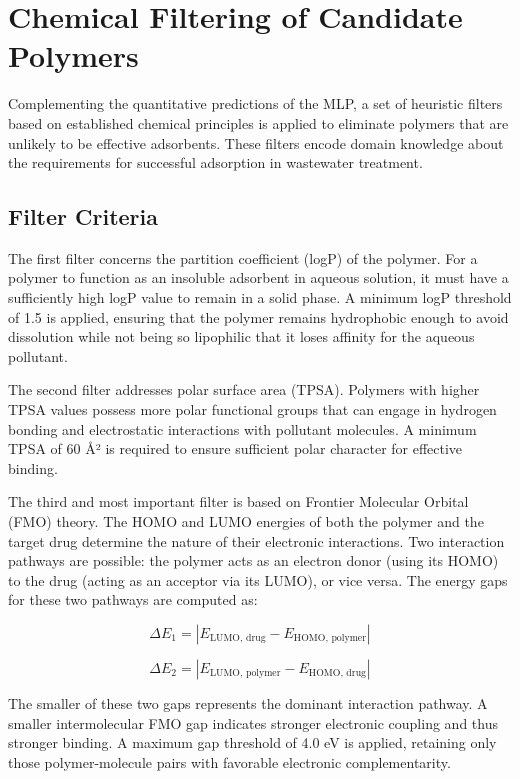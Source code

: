 \chapter{Chemical Filtering of Candidate Polymers}
\label{sec:filtering_chapter}

Complementing the quantitative predictions of the MLP, a set of heuristic filters based on established chemical principles is applied to eliminate polymers that are unlikely to be effective adsorbents. These filters encode domain knowledge about the requirements for successful adsorption in wastewater treatment.

\section{Filter Criteria}

The first filter concerns the partition coefficient (logP) of the polymer. For a polymer to function as an insoluble adsorbent in aqueous solution, it must have a sufficiently high logP value to remain in a solid phase. A minimum logP threshold of 1.5 is applied, ensuring that the polymer remains hydrophobic enough to avoid dissolution while not being so lipophilic that it loses affinity for the aqueous pollutant.

The second filter addresses polar surface area (TPSA). Polymers with higher TPSA values possess more polar functional groups that can engage in hydrogen bonding and electrostatic interactions with pollutant molecules. A minimum TPSA of 60 \r{A}² is required to ensure sufficient polar character for effective binding.

The third and most important filter is based on Frontier Molecular Orbital (FMO) theory. The HOMO and LUMO energies of both the polymer and the target drug determine the nature of their electronic interactions. Two interaction pathways are possible: the polymer acts as an electron donor (using its HOMO) to the drug (acting as an acceptor via its LUMO), or vice versa. The energy gaps for these two pathways are computed as:

\begin{equation}
	\Delta E_1 = |E_{\text{LUMO, drug}} - E_{\text{HOMO, polymer}}|
\end{equation}

\begin{equation}
	\Delta E_2 = |E_{\text{LUMO, polymer}} - E_{\text{HOMO, drug}}|
\end{equation}

The smaller of these two gaps represents the dominant interaction pathway. A smaller intermolecular FMO gap indicates stronger electronic coupling and thus stronger binding. A maximum gap threshold of 4.0 eV is applied, retaining only those polymer-molecule pairs with favorable electronic complementarity.

